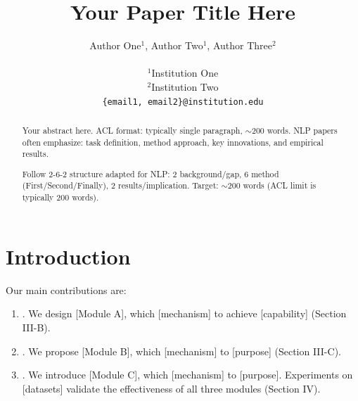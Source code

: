 \documentclass[11pt,a4paper]{article}
\title{Your Paper Title Here}
\author{
  Author One${}^1$,
  Author Two${}^1$,
  Author Three${}^2$ \\
  \\
  ${}^1$Institution One \\
  ${}^2$Institution Two \\
  \texttt{\{email1, email2\}@institution.edu}
}
\begin{document}
\maketitle

\begin{abstract}
  Your abstract here. ACL format: typically single paragraph, $\sim$200 words.
  NLP papers often emphasize: task definition, method approach, key innovations,
  and empirical results.

  Follow 2-6-2 structure adapted for NLP:
  2 background/gap,
  6 method (First/Second/Finally),
  2 results/implication.
  Target: $\sim$200 words (ACL limit is typically 200 words).
\end{abstract}

\section{Introduction}


Our main contributions are:
\begin{enumerate}
  \item [Innovation 1 contribution]. We design [Module A], which [mechanism]
        to achieve [capability] (Section III-B).
  \item [Innovation 2 contribution]. We propose [Module B], which [mechanism]
        to [purpose] (Section III-C).
  \item [Innovation 3 contribution]. We introduce [Module C], which [mechanism]
        to [purpose]. Experiments on [datasets] validate the effectiveness of
        all three modules (Section IV).
\end{enumerate}

\end{document}
